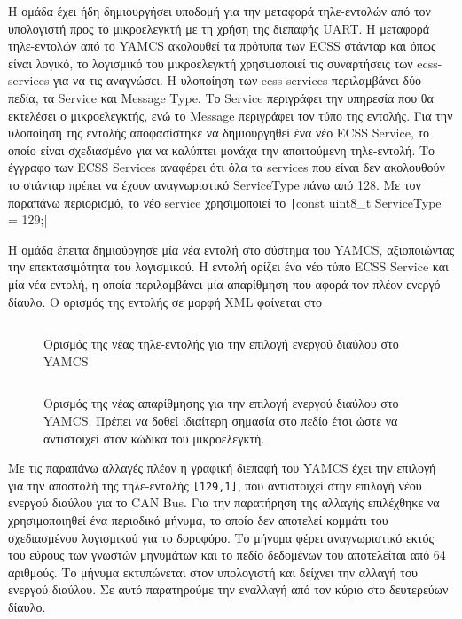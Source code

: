 \documentclass[a4paper,nobib,justified]{tufte-book}
\begin{document}
Η ομάδα έχει ήδη δημιουργήσει υποδομή για την μεταφορά τηλε-εντολών από τον υπολογιστή προς το μικροελεγκτή με τη χρήση της διεπαφής UART. Η μεταφορά τηλε-εντολών από το YAMCS ακολουθεί τα πρότυπα των ECSS στάνταρ και όπως είναι λογικό, το λογισμικό του μικροελεγκτή χρησιμοποιεί τις συναρτήσεις των ecss-services για να τις αναγνώσει. Η υλοποίηση των ecss-services περιλαμβάνει δύο πεδία, τα Service και Message Type. Το Service περιγράφει την υπηρεσία που θα εκτελέσει ο μικροελεγκτής, ενώ το Message περιγράφει τον τύπο της εντολής. Για την υλοποίηση της εντολής αποφασίστηκε να δημιουργηθεί ένα νέο ECSS Service, το οποίο είναι σχεδιασμένο για να καλύπτει μονάχα την απαιτούμενη τηλε-εντολή. Το έγγραφο των ECSS Services  αναφέρει ότι όλα τα services που είναι δεν ακολουθούν το στάνταρ πρέπει να έχουν αναγνωριστικό ServiceType πάνω από 128. Με τον παραπάνω περιορισμό, το νέο service χρησιμοποιεί το \texttt|const uint8_t ServiceType = 129;|

Η ομάδα έπειτα δημιούργησε μία νέα εντολή στο σύστημα του YAMCS, αξιοποιώντας την επεκτασιμότητα του λογισμικού. Η εντολή ορίζει ένα νέο τύπο ECSS Service και μία νέα εντολή, η οποία περιλαμβάνει μία απαρίθμηση που αφορά τον πλέον ενεργό δίαυλο. Ο ορισμός της εντολής σε μορφή XML φαίνεται στο 

\begin{figure}[h]
	\inputminted{xml}{code/examples/yamcs-129,1.xml}
	\label{code:yamcs-xml}
	\caption[Ορισμός νέας τηλε-εντολής στο YAMCS]{Ορισμός της νέας τηλε-εντολής για την επιλογή ενεργού διαύλου στο YAMCS}
\end{figure}

\begin{figure}[h]
	\inputminted{xml}{code/examples/yamcs-enumeration.xml}
	\label{code:yamcs-enumeration}
	\caption[Ορισμός της απαρίθμησης στο YAMCS]{Ορισμός της νέας απαρίθμησης για την επιλογή ενεργού διαύλου στο YAMCS. Πρέπει να δοθεί ιδιαίτερη σημασία στο πεδίο έτσι ώστε να αντιστοιχεί στον κώδικα του μικροελεγκτή.}
\end{figure}

Με τις παραπάνω αλλαγές πλέον η γραφική διεπαφή του YAMCS έχει την επιλογή για την αποστολή της τηλε-εντολής \texttt{[129,1]}, που αντιστοιχεί στην επιλογή νέου ενεργού διαύλου για το CAN Bus. Για την  παρατήρηση της αλλαγής επιλέχθηκε να χρησιμοποιηθεί ένα περιοδικό μήνυμα, το οποίο δεν αποτελεί κομμάτι του σχεδιασμένου λογισμικού για το δορυφόρο. Το μήνυμα φέρει αναγνωριστικό εκτός του εύρους των γνωστών μηνυμάτων και το πεδίο δεδομένων του αποτελείται από 64 αριθμούς. Το μήνυμα εκτυπώνεται στον υπολογιστή και δείχνει την αλλαγή του ενεργού διαύλου. Σε αυτό παρατηρούμε την εναλλαγή από τον κύριο στο δευτερεύων δίαυλο.
\end{document}
